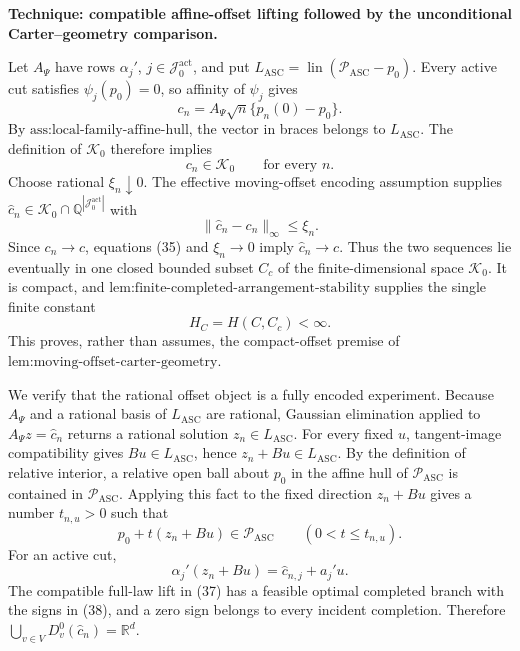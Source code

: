 \textbf{Technique: compatible affine-offset lifting followed by the unconditional Carter--geometry comparison.}

Let \(A_\Psi\) have rows \(\alpha_j'\), \(j\in\mathcal J_0^{\mathrm{act}}\), and put \(L_{\mathrm{ASC}}=\operatorname{lin}(\mathcal P_{\mathrm{ASC}}-p_0)\).  Every active cut satisfies \(\psi_j(p_0)=0\), so affinity of \(\psi_j\) gives
\[
 c_n=A_\Psi\sqrt n\{p_n(0)-p_0\}.
 \tag{33}
\]
By \(\text{ass:local-family-affine-hull}\), the vector in braces belongs to \(L_{\mathrm{ASC}}\).  The definition of \(\mathcal K_0\) therefore implies
\[
 c_n\in\mathcal K_0\qquad\text{for every }n.
 \tag{34}
\]
Choose rational \(\xi_n\downarrow0\).  The effective moving-offset encoding assumption supplies \(\widehat c_n\in\mathcal K_0\cap\mathbb Q^{|\mathcal J_0^{\mathrm{act}}|}\) with
\[
 \|\widehat c_n-c_n\|_\infty\le\xi_n.
 \tag{35}
\]
Since \(c_n\to c\), equations (35) and \(\xi_n\to0\) imply \(\widehat c_n\to c\).  Thus the two sequences lie eventually in one closed bounded subset \(C_c\) of the finite-dimensional space \(\mathcal K_0\).  It is compact, and \(\text{lem:finite-completed-arrangement-stability}\) supplies the single finite constant
\[
 H_C=H(C,C_c)<\infty.
 \tag{36}
\]
This proves, rather than assumes, the compact-offset premise of \(\text{lem:moving-offset-carter-geometry}\).

We verify that the rational offset object is a fully encoded experiment.  Because \(A_\Psi\) and a rational basis of \(L_{\mathrm{ASC}}\) are rational, Gaussian elimination applied to \(A_\Psi z=\widehat c_n\) returns a rational solution \(z_n\in L_{\mathrm{ASC}}\).  For every fixed \(u\), tangent-image compatibility gives \(Bu\in L_{\mathrm{ASC}}\), hence \(z_n+Bu\in L_{\mathrm{ASC}}\).  By the definition of relative interior, a relative open ball about \(p_0\) in the affine hull of \(\mathcal P_{\mathrm{ASC}}\) is contained in \(\mathcal P_{\mathrm{ASC}}\).  Applying this fact to the fixed direction \(z_n+Bu\) gives a number \(t_{n,u}>0\) such that
\[
 p_0+t(z_n+Bu)\in\mathcal P_{\mathrm{ASC}}
 \qquad(0<t\le t_{n,u}).
 \tag{37}
\]
For an active cut,
\[
 \alpha_j'(z_n+Bu)=\widehat c_{n,j}+a_j'u.
 \tag{38}
\]
The compatible full-law lift in (37) has a feasible optimal completed branch with the signs in (38), and a zero sign belongs to every incident completion.  Therefore \(\bigcup_{v\in V}D_v^0(\widehat c_n)=\mathbb R^d\).


